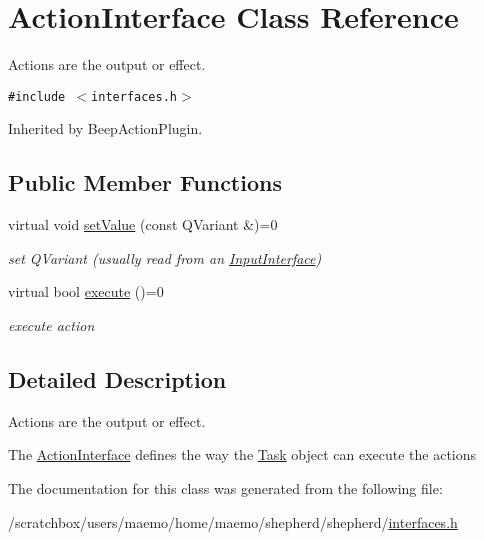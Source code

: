 \hypertarget{class_action_interface}{
\section{ActionInterface Class Reference}
\label{class_action_interface}
}
Actions are the output or effect.  


{\tt \#include $<$interfaces.h$>$}

Inherited by BeepActionPlugin.

\subsection*{Public Member Functions}
\begin{CompactItemize}
\item 
\hypertarget{class_action_interface_4a3b360ed49081078c5a406c54b0b5c6}{
virtual void \hyperlink{class_action_interface_4a3b360ed49081078c5a406c54b0b5c6}{setValue} (const QVariant \&)=0}
\label{class_action_interface_4a3b360ed49081078c5a406c54b0b5c6}

\begin{CompactList}\small\item\em set QVariant (usually read from an \hyperlink{class_input_interface}{InputInterface}) \item\end{CompactList}\item 
\hypertarget{class_action_interface_e1463006b393a6f774178955fe4b6ad0}{
virtual bool \hyperlink{class_action_interface_e1463006b393a6f774178955fe4b6ad0}{execute} ()=0}
\label{class_action_interface_e1463006b393a6f774178955fe4b6ad0}

\begin{CompactList}\small\item\em execute action \item\end{CompactList}\end{CompactItemize}


\subsection{Detailed Description}
Actions are the output or effect. 

The \hyperlink{class_action_interface}{ActionInterface} defines the way the \hyperlink{class_task}{Task} object can execute the actions 

The documentation for this class was generated from the following file:\begin{CompactItemize}
\item 
/scratchbox/users/maemo/home/maemo/shepherd/shepherd/\hyperlink{interfaces_8h}{interfaces.h}\end{CompactItemize}
